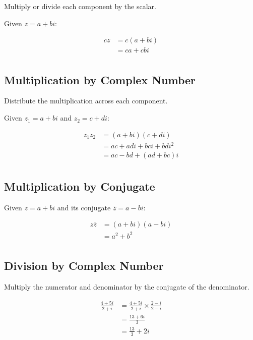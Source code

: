 \documentclass[a4paper,11pt]{article}
\begin{document}
Multiply or divide each component by the scalar.

Given $z = a + bi$:

$$
\begin{aligned}
cz & = c(a + bi) \\
& = ca + cbi \\
\end{aligned}
$$


\subsection{Multiplication by Complex Number}

Distribute the multiplication across each component.

Given $z_1 = a + bi$ and $z_2 = c + di$:

$$
\begin{aligned}
z_1 z_2 & = (a + bi)(c + di) \\
& = ac + adi + bci + bdi^2 \\
& = ac - bd + (ad + bc)i \\
\end{aligned}
$$


\subsection{Multiplication by Conjugate}

Given $z = a + bi$ and its conjugate $\overline{z} = a - bi$:

$$
\begin{aligned}
z \overline{z} & = (a + bi)(a - bi) \\
& = a^2 + b^2 \\
\end{aligned}
$$


\subsection{Division by Complex Number}

Multiply the numerator and denominator by the conjugate of the denominator.

$$
\begin{aligned}
\frac{4 + 5i}{2 + i} & = \frac{4 + 5i}{2 + i} \times \frac{2 - i}{2 - i} \\
& = \frac{13 + 6i}{3} \\
& = \frac{13}{3} + 2i \\
\end{aligned}
$$
\end{document}
